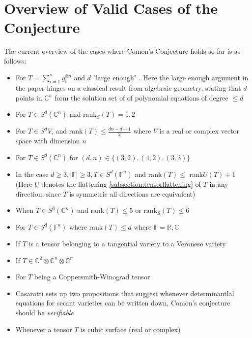 \documentclass[12pt,a4paper,oneside]{book}
\def\reals{\mathbb{R}} %
\def\complex{\mathbb{C}} %
\theoremstyle{definition}
\begin{document}
\section{Overview of Valid Cases of the Conjecture}\label{section:validoverview}
The current overview of the cases where Comon's Conjecture holds so far is as follows: \begin{itemize}
	\item For $T = \sum_{i=1}^{s} y_i^{\otimes d}$ and $d$ "large enough" \cite{comon_symmetric_2008}. Here the large enough argument in the paper hinges on a classical result from algebraic geometry, stating that $d$ points in $\complex^n$ form the solution set of of polynomial equations of degree $\leq d$
	\item For $T \in S^d(\complex^n)$ and $\text{rank}_S(T) = 1, 2$ \cite{comon_symmetric_2008}
	\item For $T \in S^d{V}$, and rank$(T) \leq \frac{dn - d + 1}{2}$ where $V$ is a real or complex vector space with dimension $n$ \cite{oeding_report_2008}
	\item For $T \in S^d(\complex^n)$ for $(d,n) \in \{(3,2), (4,2), (3,3)\}$ \cite{friedland_remarks_2016}
	\item In the case $d \geq 3, | \mathbb{F} | \geq 3, T \in S^d(\mathbb{F}^n)$ and rank$(T) \leq$ rank$U(T) + 1$ (Here $U$ denotes the flattening \cref{subsection:tensorflattening}  of $T$ in any direction, since $T$ is symmetric all directions are equivalent) \cite{friedland_remarks_2016}
	\item When $T \in S^3(\complex^n)$ and rank$(T) \leq 5$ or rank$_S(T) \leq 6$ \cite{friedland_remarks_2016}
	\item For $T \in S^d(\mathbb{F}^n)$ where rank$(T) \leq d$ where $\mathbb{F} = \reals , \complex$\cite{zhang_comons_2016}
	\item If $T$ is a tensor belonging to a tangential variety to a Veronese variety \cite{ballico_tensor_2013}
	\item If $T \in \complex^2 \otimes \complex^n \otimes \complex^n$ \cite{buczynski_ranks_2013}
	\item For $T$ being a Coppersmith-Winograd tensor \cite{landsberg_abelian_2017}
	\item Casarotti \cite{casarotti_comons_2018} sets up two propositions that suggest whenever determinantlal equations for secant varieties can be written down, Comon's conjecture should be \textit{verifiable}
	\item Whenever a tensor $T$ is cubic surface (real or complex) \cite{seigal_ranks_2020}
\end{itemize}
\end{document}

